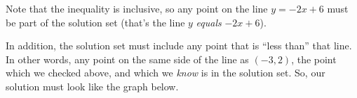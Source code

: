 Note that the inequality is inclusive, so any point on the line $y = -2x + 6$ must be part of the solution set (that's the line $y$ \textit{equals} $-2x + 6$).

In addition, the solution set must include any point that is ``less than'' that line. In other words, any point on the same side of the line as $(-3,2)$, the point which we checked above, and which we \textit{know} is in the solution set. So, our solution must look like the graph below.
\begin{center}
\end{center}


